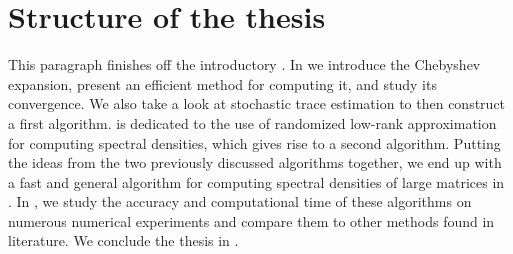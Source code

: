 
\section{Structure of the thesis}
\label{sec:1-introduction-structure}

This paragraph finishes off the introductory .
In  we introduce the Chebyshev expansion, present an
efficient method for computing it, and study its convergence. We also take a
look at stochastic trace estimation to then construct a first algorithm.
 is dedicated to the use of randomized low-rank approximation
for computing spectral densities, which gives rise to a second algorithm.
Putting the ideas from the two previously discussed algorithms together,
we end up with a fast and general algorithm for computing spectral densities
of large matrices in . In ,
we study the accuracy and computational time of these algorithms on numerous
numerical experiments and compare them to other methods found in literature.
We conclude the thesis in .
